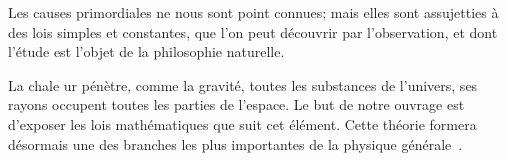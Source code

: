 \documentclass[largesc,upint,varvw,barcolor=Red4,nocopyright,hyphenate,balance,lang-second=french,lang=english]{asmejour}
\begin{document}
Les causes primordiales ne nous sont point con­nues; mais elles sont assujetties à des lois simples et constantes, que l'on peut découvrir par l'obser­vation, et dont l'étude est l'objet de la philosophie naturelle. 

La chale ur pénètre, comme la gravité, toutes les substances de l'univers, ses rayons occupent toutes les parties de l'espace. Le but de notre ouvrage est d'exposer les lois mathématiques que suit cet élé­ment. Cette théorie formera désormais une des branches les plus importantes de la physique gé­nérale~\cite{fourier1822}. 




\nocite{*} %




\end{document}
